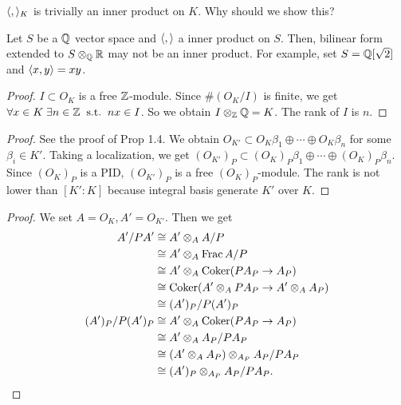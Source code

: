 \begin{rem}
  $\langle , \rangle_K$ is trivially an inner product on $K$. Why should we show this?

  Let $S$ be a ${\mathbb Q}$ vector space and $\langle , \rangle$ a inner product on $S$. Then, bilinear form extended to $S \otimes_{{\mathbb Q}} {\mathbb R}$ may not be an inner product. For example, set $S = {\mathbb Q}[\sqrt{2}]$ and $\langle x,y \rangle = xy$. 
\end{rem}



\begin{proof}
  $I \subset O_K$ is a free ${\mathbb Z}$-module. Since $\# (O_K/I)$ is finite, we get $\forall x \in K \; \exists n \in {\mathbb Z} \; \; \text{s.t.} \; \; nx \in I$. So we obtain $I \otimes_{{\mathbb Z}} {\mathbb Q} = K$. The rank of $I$ is $n$.
\end{proof}

\begin{proof}
See the proof of Prop 1.4. We obtain $O_{K'} \subset O_K \beta_1 \oplus \cdots \oplus  O_K \beta_n$ for some $\beta_i \in K'$. Taking a localization, we get $(O_{K'})_P \subset (O_K)_P \beta_1 \oplus \cdots \oplus  (O_K)_P \beta_n$. Since $(O_K)_P$ is a PID, $(O_{K'})_P$ is a free $(O_K)_P$-module. The rank is not lower than $[K':K]$ because integral basis generate $K'$ over $K$.
\end{proof}


\begin{proof}
  We set $A = O_K, A'=O_{K'}$. Then we get
  \begin{align*}
    A'/PA' &\cong A' \otimes_A A/P \\
    &\cong A' \otimes_A \operatorname{Frac} A/P \\
    &\cong A' \otimes_A \operatorname{Coker} (PA_P \to A_P) \\
    &\cong \operatorname{Coker} (A' \otimes_A PA_P \to A' \otimes_A A_P) \\
    &\cong (A')_P / P(A')_P \\
    (A')_P / P(A')_P  &\cong A' \otimes_A \operatorname{Coker} (PA_P \to A_P) \\
    &\cong A' \otimes_A A_P / PA_P \\
    &\cong (A' \otimes_A  A_P) \otimes_{A_P} A_P / PA_P \\
    &\cong (A')_P \otimes_{A_P} A_P / PA_P.
  \end{align*}
\end{proof}



